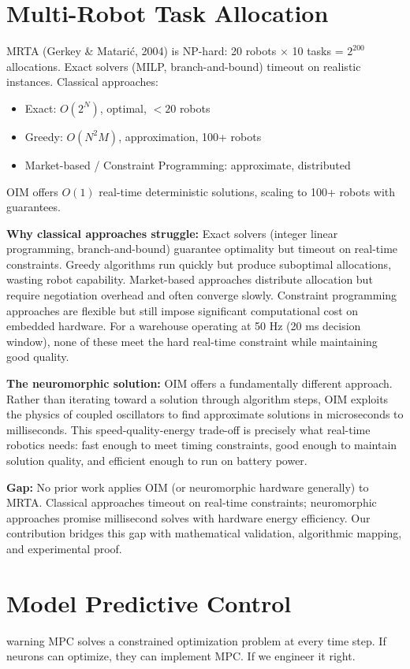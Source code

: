 \section{Multi-Robot Task Allocation}

MRTA (Gerkey & Matarić, 2004) is NP-hard: 20 robots × 10 tasks = $2^{200}$ allocations. Exact solvers (MILP, branch-and-bound) timeout on realistic instances. Classical approaches:
\begin{itemize}
\item Exact: $O(2^N)$, optimal, $< 20$ robots
\item Greedy: $O(N^2M)$, approximation, 100+ robots
\item Market-based / Constraint Programming: approximate, distributed
\end{itemize}
OIM offers $O(1)$ real-time deterministic solutions, scaling to 100+ robots with guarantees.

\textbf{Why classical approaches struggle:} Exact solvers (integer linear programming, branch-and-bound) guarantee optimality but timeout on real-time constraints. Greedy algorithms run quickly but produce suboptimal allocations, wasting robot capability. Market-based approaches distribute allocation but require negotiation overhead and often converge slowly. Constraint programming approaches are flexible but still impose significant computational cost on embedded hardware. For a warehouse operating at 50 Hz (20 ms decision window), none of these meet the hard real-time constraint while maintaining good quality.

\textbf{The neuromorphic solution:} OIM offers a fundamentally different approach. Rather than iterating toward a solution through algorithm steps, OIM exploits the physics of coupled oscillators to find approximate solutions in microseconds to milliseconds. This speed-quality-energy trade-off is precisely what real-time robotics needs: fast enough to meet timing constraints, good enough to maintain solution quality, and efficient enough to run on battery power.

\textbf{Gap:} No prior work applies OIM (or neuromorphic hardware generally) to MRTA. Classical approaches timeout on real-time constraints; neuromorphic approaches promise millisecond solves with hardware energy efficiency. Our contribution bridges this gap with mathematical validation, algorithmic mapping, and experimental proof.

\section{Model Predictive Control}
\begin{block}{warning}
MPC solves a constrained optimization problem at every time step. If neurons can optimize, they can implement MPC. If we engineer it right.
\end{block}


